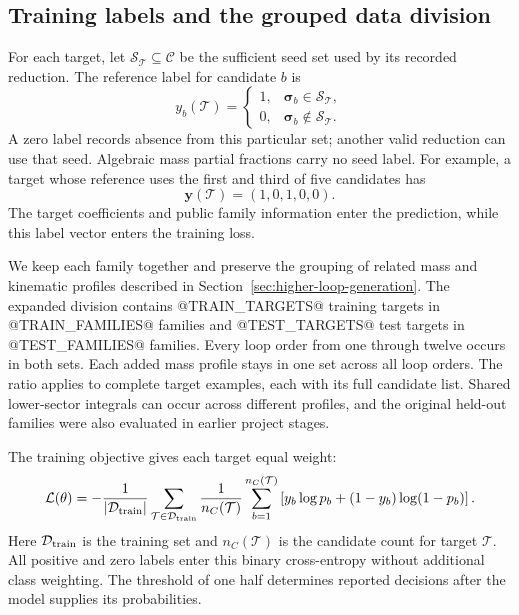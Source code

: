 \subsection{Training labels and the grouped data division}
\label{sec:seed-model-split}
For each target, let $\mathcal S_{\mathcal T}\subseteq\mathcal C$
be the sufficient seed set used by its recorded reduction.
The reference label for candidate $b$ is
\begin{equation}
 y_b(\mathcal T)=
 \begin{cases}
 1,&\boldsymbol\sigma_b\in\mathcal S_{\mathcal T},\\
 0,&\boldsymbol\sigma_b\notin\mathcal S_{\mathcal T}.
 \end{cases}
 \label{eq:seed-membership-label}
\end{equation}
A zero label records absence from this particular set; another valid
reduction can use that seed. Algebraic mass partial fractions carry
no seed label. For example, a target whose reference uses the first
and third of five candidates has
\begin{equation}
 \boldsymbol y(\mathcal T)=(1,0,1,0,0).
 \label{eq:seed-label-example}
\end{equation}
The target coefficients and public family information enter the
prediction, while this label vector enters the training loss.

We keep each family together and preserve the grouping of related
mass and kinematic profiles described in
Section~\ref{sec:higher-loop-generation}. The expanded division
contains @TRAIN_TARGETS@ training targets in @TRAIN_FAMILIES@
families and @TEST_TARGETS@ test targets in @TEST_FAMILIES@
families. Every loop order from one through twelve occurs in both
sets. Each added mass profile stays in one set across all loop orders.
The ratio applies to complete target examples, each with its full
candidate list. Shared lower-sector integrals can occur across
different profiles, and the original held-out families were also
evaluated in earlier project stages.

The training objective gives each target equal weight:
\begin{equation}
 \mathcal L(\theta)=
 -\frac{1}{|\mathcal D_{\rm train}|}
 \sum_{\mathcal T\in\mathcal D_{\rm train}}
 \frac{1}{n_C(\mathcal T)}
 \sum_{b=1}^{n_C(\mathcal T)}
 \left[y_b\log p_b+(1-y_b)\log(1-p_b)\right].
 \label{eq:seed-training-loss}
\end{equation}
Here $\mathcal D_{\rm train}$ is the training set and
$n_C(\mathcal T)$ is the candidate count for target $\mathcal T$.
All positive and zero labels enter this binary cross-entropy without
additional class weighting. The threshold of one half determines
reported decisions after the model supplies its probabilities.

